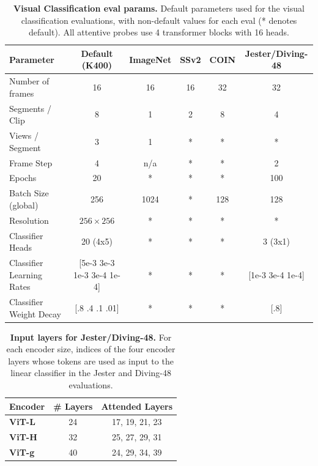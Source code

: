 \documentclass[]{fairmeta}
\begin{document}
\begin{table}[t]
    \small
    \caption{\small{\bf Visual Classification eval params.} Default parameters used for the visual classification evaluations, with non-default values for each eval (* denotes default). All attentive probes use 4 transformer blocks with 16 heads.}
    \centering
    \label{tb:understanding_params}
    \begin{tabular}{l c c c c c}
      \bf Parameter & \bf Default (K400) & \bf ImageNet & \bf SSv2 & \bf COIN & \bf Jester/Diving-48 \\
        \toprule
        Number of frames & 16 & 16 & 16 & 32 & 32 \\
        Segments / Clip & 8 & 1 & 2 & 8 & 4 \\
        Views / Segment & 3 & 1 & * & * & * \\
        Frame Step & 4 & n/a & * & *  & 2 \\
        Epochs & 20 & * & * & * & 100 \\
        Batch Size (global) & 256 & 1024 & * & 128 & 128 \\
        Resolution & $256\times256$ & * & * & * & * \\
        Classifier Heads & 20 (4x5) & * & * & * & 3 (3x1) \\
        Classifier Learning Rates & [5e-3 3e-3 1e-3 3e-4 1e-4] & * & * & * & [1e-3 3e-4 1e-4] \\
        Classifier Weight Decay & [.8 .4 .1 .01] & * & * & * & [.8] \\
        \bottomrule
    \end{tabular}
\end{table}
\begin{table}[t]
    \small
    \caption{\small{\bf Input layers for Jester/Diving-48.} \small For each encoder size, indices of the four encoder layers whose tokens are used as input to the linear classifier in the Jester and Diving-48 evaluations.}
    \centering
    \label{tb:understanding_layers}
    \begin{tabular}{l c c}
        \bf Encoder & \bf \# Layers & \bf Attended Layers \\
        \toprule
        \bf ViT-L & 24 & 17, 19, 21, 23 \\
        \bf ViT-H & 32 & 25, 27, 29, 31 \\
        \bf ViT-g & 40 & 24, 29, 34, 39 \\
        \bottomrule
    \end{tabular}
\end{table}
\end{document}
